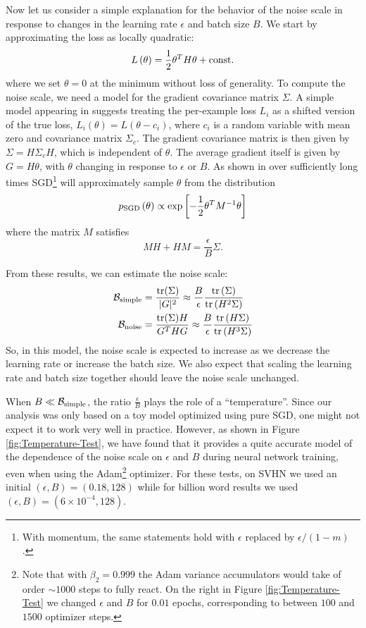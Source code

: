 \documentclass[english]{article}
\newcommand{\CB}{{\cal B}}
\begin{document}
Now let us consider a simple  explanation for the behavior of the noise scale in response to changes in the learning rate $\epsilon$ and batch size $B$.  
We start by approximating the loss as locally quadratic:
\[
L\left(\theta\right)=\frac{1}{2}\theta^{T}H\theta+{\rm const.}
\]
where we set $\theta=0$ at the minimum without loss of generality. To compute the noise scale, we need a model for the gradient covariance matrix $\Sigma$. A simple model appearing in \cite{conf/icml/SchaulZL13} suggests treating the per-example loss $L_{i}$ as a shifted version of the true loss, $L_{i}\left(\theta\right)=L\left(\theta-c_{i}\right)$, where $c_{i}$ is a random variable with mean zero and covariance matrix $\Sigma_{c}$. The gradient covariance matrix is then given by $\Sigma=H\Sigma_{c}H$, which is independent of $\theta$. The average gradient itself is given by $G=H\theta$, with $\theta$ changing in response to $\epsilon$ or $B$. As shown in \cite{1704.04289} over sufficiently long times SGD\footnote{With momentum, the same statements hold with $\epsilon$ replaced by $\epsilon/\left(1-m\right)$.} will approximately sample $\theta$ from the distribution
\[
p_{{\rm SGD}}\left(\theta\right)\propto\exp\left[-\frac{1}{2}\theta^{T}M^{-1}\theta\right]
\]
where the matrix $M$ satisfies
\[
MH+HM=\frac{\epsilon}{B}\Sigma.
\]

From these results, we can estimate the noise scale:
\begin{align*}
\mathcal{B}_{{\rm simple}} & =\frac{{\rm tr}(\Sigma)}{|G|^{2}}\approx\frac{B}{\epsilon}\frac{{\rm tr}\left(\Sigma\right)}{{\rm tr}\left(H^{2}\Sigma\right)}\\
\mathcal{B}_{{\rm noise}} & =\frac{{\rm tr}(\Sigma) H}{G^{T}HG}\approx\frac{B}{\epsilon}\frac{{\rm tr}\left(H\Sigma\right)}{{\rm tr}\left(H^{3}\Sigma\right)}
\end{align*}
So, in this model, the noise scale is expected to increase as we decrease the learning rate or increase the batch size.   We also expect that scaling the learning rate and batch size together should leave the noise scale unchanged.

When $B \ll \CB_{\rm simple}$, the ratio $\frac{\epsilon}{B}$  plays the role of a ``temperature''.  Since our analysis was only based on a toy model optimized using pure SGD, one might not expect it to work very well in practice.  However, as shown in Figure \ref{fig:Temperature-Test}, we have found that it provides a quite accurate model of the dependence of the noise scale on $\epsilon$ and  $B$ during neural network training, even when using the Adam\footnote{Note that with $\beta_2 = 0.999$ the Adam variance accumulators would take of order $\sim 1000$ steps to fully react.  On the right in Figure \ref{fig:Temperature-Test} we changed $\epsilon$ and $B$ for $0.01$ epochs, corresponding to between  $100$ and $1500$ optimizer steps.} optimizer.  For these tests, on SVHN we used an initial $(\epsilon, B) = (0.18, 128)$ while for billion word results we used $(\epsilon, B) = (6 \times 10^{-4}, 128)$.
\end{document}
